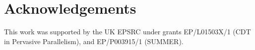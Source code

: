 \section{Acknowledgements}

This work was supported by the UK EPSRC under grants EP/L01503X/1 (CDT in
Pervasive Parallelism), and EP/P003915/1 (SUMMER).
